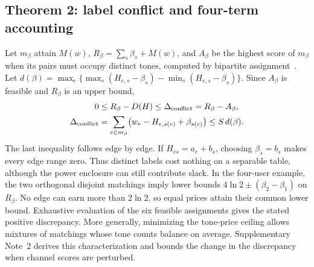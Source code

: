 \subsection*{Theorem 2: label conflict and four-term accounting}
Let \(m_\beta\) attain \(M(w)\), \(R_\beta=\sum_s\beta_s+M(w)\), and \(A_\beta\) be the highest score of \(m_\beta\) when its pairs must occupy distinct tones, computed by bipartite assignment~\cite{kuhn}. Let \(d(\beta)=\max_e\{\max_s(H_{e,s}-\beta_s)-\min_s(H_{e,s}-\beta_s)\}\). Since \(A_\beta\) is feasible and \(R_\beta\) is an upper bound,
\begin{equation}
\begin{aligned}
0 &\le R_\beta-D(H)\le\Delta_{\mathrm{conflict}}=R_\beta-A_\beta,\\
\Delta_{\mathrm{conflict}} &=\sum_{e\in m_\beta}\bigl(w_e-H_{e,s(e)}+\beta_{s(e)}\bigr)
       \le S\,d(\beta).
\end{aligned}
\label{eq:conflict}
\end{equation}
The last inequality follows edge by edge. If \(H_{es}=a_e+b_s\), choosing \(\beta_s=b_s\) makes every edge range zero. Thus distinct labels cost nothing on a separable table, although the power enclosure can still contribute slack. In the four-user example, the two orthogonal disjoint matchings imply lower bounds \(4\ln2\pm(\beta_2-\beta_1)\) on \(R_\beta\). No edge can earn more than \(2\ln2\), so equal prices attain their common lower bound. Exhaustive evaluation of the six feasible assignments gives the stated positive discrepancy. More generally, minimizing the tone-price ceiling allows mixtures of matchings whose tone counts balance on average. Supplementary Note~2 derives this characterization and bounds the change in the discrepancy when channel scores are perturbed.

